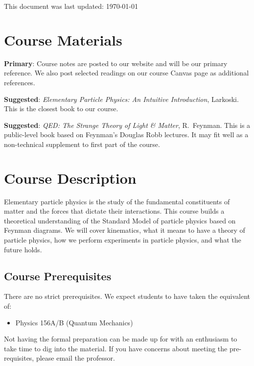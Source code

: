 \documentclass[12pt]{article}
\numberwithin{equation}{section}    %
\begin{document}
\vspace{.5em}
\noindent This document was last updated: \today


\section{Course Materials}



\noindent\textbf{Primary}: Course notes are posted to our website and will be our primary reference. We also post selected readings on our course Canvas page as additional references. 
\vspace{.5em}

\noindent\textbf{Suggested}: \emph{Elementary Particle Physics: An Intuitive Introduction}, Larkoski. This is the closest book to our course.
\vspace{.5em}

\noindent\textbf{Suggested}: \emph{QED: The Strange Theory of Light \& Matter}, R.~Feynman. This is a public-level book based on Feynman's Douglas Robb lectures. It may fit well as a non-technical supplement to first part of the course.



\section{Course Description}

Elementary particle physics is the study of the fundamental constituents of matter and the forces that dictate their interactions. This course builds a theoretical understanding of the Standard Model of particle physics based on Feynman diagrams. We will cover kinematics, what it means to have a theory of particle physics, how we perform experiments in particle physics, and what the future holds.


\subsection{Course Prerequisites}


There are no strict prerequisites. We expect students to have taken the equivalent of:
\begin{itemize}
	\item Physics 156A/B (Quantum Mechanics)
\end{itemize}
Not having the formal preparation can be made up for with an enthusiasm to take time to dig into the material. If you have concerns about meeting the pre-requisites, please email the professor.
\end{document}
